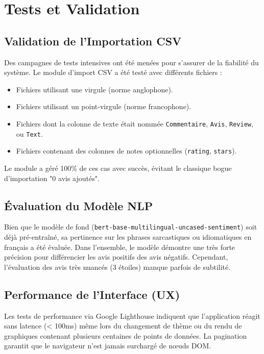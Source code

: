 \documentclass[12pt,a4paper]{article}
\begin{document}
\section{Tests et Validation}
\subsection{Validation de l'Importation CSV}
Des campagnes de tests intensives ont été menées pour s'assurer de la fiabilité du système. Le module d'import CSV a été testé avec différents fichiers :
\begin{itemize}
    \item Fichiers utilisant une virgule (norme anglophone).
    \item Fichiers utilisant un point-virgule (norme francophone).
    \item Fichiers dont la colonne de texte était nommée \texttt{Commentaire}, \texttt{Avis}, \texttt{Review}, ou \texttt{Text}.
    \item Fichiers contenant des colonnes de notes optionnelles (\texttt{rating}, \texttt{stars}).
\end{itemize}
Le module a géré 100\% de ces cas avec succès, évitant le classique bogue d'importation "0 avis ajoutés".

\subsection{Évaluation du Modèle NLP}
Bien que le modèle de fond (\texttt{bert-base-multilingual-uncased-sentiment}) soit déjà pré-entraîné, sa pertinence sur les phrases sarcastiques ou idiomatiques en français a été évaluée.
Dans l'ensemble, le modèle démontre une très forte précision pour différencier les avis positifs des avis négatifs. Cependant, l'évaluation des avis très nuancés (3 étoiles) manque parfois de subtilité.

\subsection{Performance de l'Interface (UX)}
Les tests de performance via Google Lighthouse indiquent que l'application réagit sans latence (< 100ms) même lors du changement de thème ou du rendu de graphiques contenant plusieurs centaines de points de données. La pagination garantit que le navigateur n'est jamais surchargé de n{\oe}uds DOM.
\newpage
\end{document}
